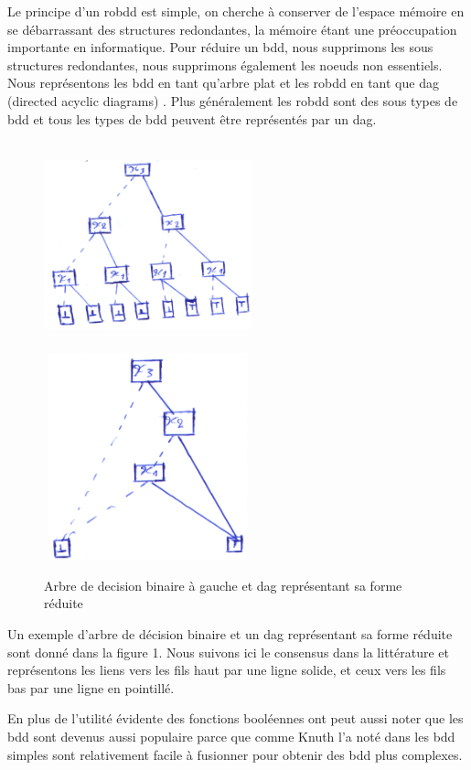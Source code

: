\documentclass[french]{article}
\begin{document}
Le principe d'un robdd est simple, on cherche à conserver de l'espace mémoire en se débarrassant des structures redondantes, la mémoire étant une préoccupation importante en informatique. Pour réduire un bdd, nous supprimons les sous structures redondantes, nous supprimons également les noeuds non essentiels. Nous représentons les bdd en tant qu'arbre plat et les robdd en tant que dag (directed acyclic diagrams) \cite{flajolet_automata}. Plus généralement les robdd sont des sous types de bdd et tous les types de bdd peuvent être représentés par un dag.

\begin{figure}[htp]
    \centering
    \includegraphics[width=6cm, height=6cm]{tree019}
    \includegraphics[width=6cm, height=6cm]{tree020}
    \caption{Arbre de decision binaire à gauche et dag représentant sa forme réduite}
    \label{fig:Figure1.1}
\end{figure}
\newpage
Un exemple d'arbre de décision binaire et un dag représentant sa forme réduite sont donné dans la figure 1. Nous suivons ici le consensus dans la littérature et représentons les liens vers les fils haut par une ligne solide, et ceux vers les fils bas par une ligne en pointillé.

En plus de l'utilité évidente des fonctions booléennes ont peut aussi noter que les bdd sont devenus aussi populaire parce que comme Knuth l'a noté dans \cite{knuth} les bdd simples sont relativement facile à fusionner pour obtenir des bdd plus complexes.
\end{document}
